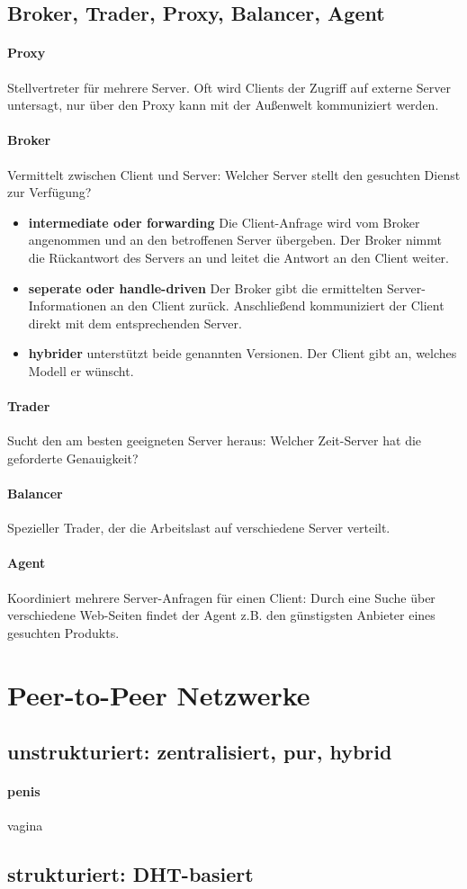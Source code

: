 \documentclass[a4paper]{article}
\begin{document}
	\subsection{Broker, Trader, Proxy, Balancer, Agent}
		\paragraph{Proxy}Stellvertreter für mehrere Server. Oft wird Clients der Zugriff auf externe Server untersagt, nur über den Proxy kann mit der Außenwelt kommuniziert werden.
		\paragraph{Broker} Vermittelt zwischen Client und Server: Welcher Server stellt den gesuchten Dienst zur Verfügung?
			\begin{itemize}
				\item \textbf{intermediate oder forwarding} Die Client-Anfrage wird vom Broker angenommen und an den betroffenen Server übergeben. Der Broker nimmt die Rückantwort des Servers an und leitet die Antwort an den Client weiter.
				\item \textbf{seperate oder handle-driven} Der Broker gibt die ermittelten Server-Informationen an den Client zurück. Anschließend kommuniziert der Client direkt mit dem entsprechenden Server.
				\item \textbf{hybrider} unterstützt beide genannten Versionen. Der Client gibt an, welches Modell er wünscht.
			\end{itemize}
		\paragraph{Trader} Sucht den am besten geeigneten Server heraus: Welcher Zeit-Server hat die geforderte Genauigkeit?
		\paragraph{Balancer}Spezieller Trader, der die Arbeitslast auf verschiedene Server verteilt.
		\paragraph{Agent}Koordiniert mehrere Server-Anfragen für einen Client: Durch eine Suche über verschiedene Web-Seiten findet der Agent z.B. den günstigsten Anbieter eines gesuchten Produkts.
\pagebreak
\section{Peer-to-Peer Netzwerke}
	\subsection{unstrukturiert: zentralisiert, pur, hybrid}
		\paragraph{penis}vagina
	\subsection{strukturiert: DHT-basiert}
\end{document}
